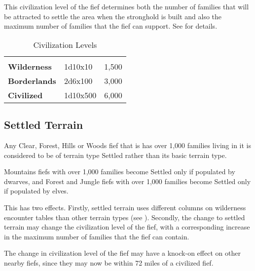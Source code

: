 \begin{multicols*}{2}
This civilization level of the fief determines both the number of families that will be attracted to settle the area when the stronghold is built and also the maximum number of families that the fief can support. See  for details.

\begin {table}[H]
  \caption{Civilization Levels}\label{tab:Civilization Levels}
  \begin{tabularx}{\columnwidth}{>{\bfseries}YYY}
	 &  & \\
	Wilderness & 1d10x10 & 1,500\\
	Borderlands & 2d6x100 & 3,000\\
	Civilized & 1d10x500 & 6,000
  \end {tabularx}
\end {table}

\subsection{Settled Terrain}
Any Clear, Forest, Hills or Woods fief that is has over 1,000 families living in it is considered to be of terrain type Settled rather than its basic terrain type.

Mountains fiefs with over 1,000 families become Settled only if populated by dwarves, and Forest and Jungle fiefs with over 1,000 families become Settled only if populated by elves.

This has two effects. Firstly, settled terrain uses different columns on wilderness encounter tables than other terrain types (see ). Secondly, the change to settled terrain may change the civilization level of the fief, with a corresponding increase in the maximum number of families that the fief can contain.

The change in civilization level of the fief may have a knock-on effect on other nearby fiefs, since they may now be within 72 miles of a civilized fief.

\end{multicols*}
